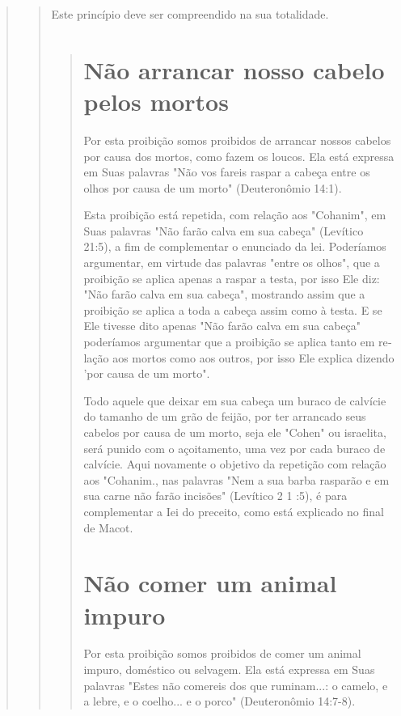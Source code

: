 \begin{quote}
\begin{quote}
Este princípio deve ser compreendido na sua totalidade.

\begin{quote}
\section{Não arrancar nosso cabelo pelos mortos}

Por esta proibição somos proibidos de arrancar nossos cabelos por causa
dos mortos, como fazem os loucos. Ela está expressa em Suas palavras
"Não vos fareis raspar a cabeça entre os olhos por causa de um morto"
(Deute­ronômio 14:1).

Esta proibição está repetida, com relação aos "Cohanim", em Suas
palavras "Não farão calva em sua cabeça" (Levítico 21:5), a fim de
complemen­tar o enunciado da lei. Poderíamos argumentar, em virtude das
palavras "entre os olhos", que a proibição se aplica apenas a raspar a
testa, por isso Ele diz: "Não farão calva em sua cabeça", mostrando
assim que a proibição se aplica a toda a cabeça assim como à testa. E se
Ele tivesse dito apenas "Não farão calva em sua cabeça" poderíamos
argumentar que a proibição se aplica tanto em re­lação aos mortos como
aos outros, por isso Ele explica dizendo 'por causa de um morto".

Todo aquele que deixar em sua cabeça um buraco de calvície do ta­manho
de um grão de feijão, por ter arrancado seus cabelos por causa de um
morto, seja ele "Cohen" ou israelita, será punido com o açoitamento, uma
vez por cada buraco de calvície. Aqui novamente
o objetivo da repetição com relação aos
"Cohanim., nas palavras "Nem a sua barba rasparão e em
sua carne não farão incisões" (Le­vítico 2 1 :5), é para complementar a
Iei do preceito, como está explicado no final de Macot.

\section{Não comer um animal impuro}

Por esta proibição somos proibidos de comer um animal impuro, doméstico
ou selvagem. Ela está expressa em Suas palavras "Estes não come­reis dos
que ruminam...: o camelo, e a lebre, e o coelho... e o porco"
(Deutero­nômio 14:7-8).


\end{quote}
\end{quote}
\end{quote}
